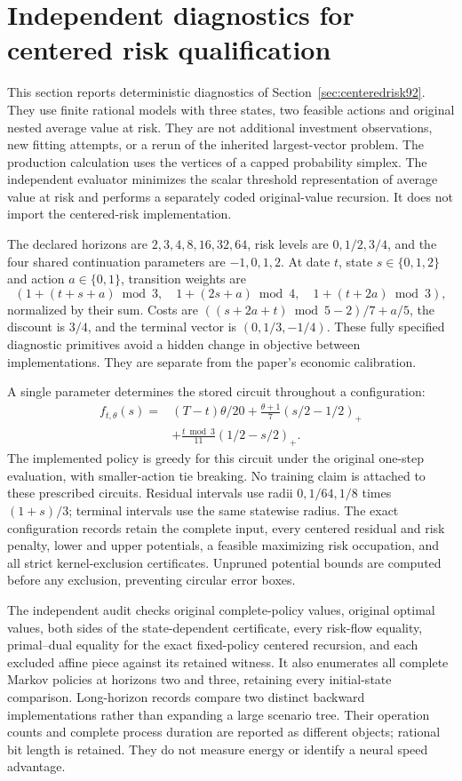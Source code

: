 \section{Independent diagnostics for centered risk qualification}\label{app:evidence92}
This section reports deterministic diagnostics of Section~\ref{sec:centeredrisk92}. They use finite rational models with three states, two feasible actions and original nested average value at risk. They are not additional investment observations, new fitting attempts, or a rerun of the inherited largest-vector problem. The production calculation uses the vertices of a capped probability simplex. The independent evaluator minimizes the scalar threshold representation of average value at risk and performs a separately coded original-value recursion. It does not import the centered-risk implementation.

The declared horizons are $2,3,4,8,16,32,64$, risk levels are $0,1/2,3/4$, and the four shared continuation parameters are $-1,0,1,2$. At date $t$, state $s\in\{0,1,2\}$ and action $a\in\{0,1\}$, transition weights are
\[
 (1+(t+s+a)\bmod3,\quad 1+(2s+a)\bmod4,\quad
       1+(t+2a)\bmod3),
\]
normalized by their sum. Costs are $((s+2a+t)\bmod5-2)/7+a/5$, the discount is $3/4$, and the terminal vector is $(0,1/3,-1/4)$. These fully specified diagnostic primitives avoid a hidden change in objective between implementations. They are separate from the paper's economic calibration.

A single parameter determines the stored circuit throughout a configuration:
\begin{align*}
 f_{t,\theta}(s)={}&(T-t)\theta/20
 +\frac{\theta+1}{7}(s/2-1/2)_+\\
 &+\frac{t\bmod3}{11}(1/2-s/2)_+.
\end{align*}
The implemented policy is greedy for this circuit under the original one-step evaluation, with smaller-action tie breaking. No training claim is attached to these prescribed circuits. Residual intervals use radii $0,1/64,1/8$ times $(1+s)/3$; terminal intervals use the same statewise radius. The exact configuration records retain the complete input, every centered residual and risk penalty, lower and upper potentials, a feasible maximizing risk occupation, and all strict kernel-exclusion certificates. Unpruned potential bounds are computed before any exclusion, preventing circular error boxes.



The independent audit checks original complete-policy values, original optimal values, both sides of the state-dependent certificate, every risk-flow equality, primal--dual equality for the exact fixed-policy centered recursion, and each excluded affine piece against its retained witness. It also enumerates all complete Markov policies at horizons two and three, retaining every initial-state comparison. Long-horizon records compare two distinct backward implementations rather than expanding a large scenario tree. Their operation counts and complete process duration are reported as different objects; rational bit length is retained. They do not measure energy or identify a neural speed advantage.

